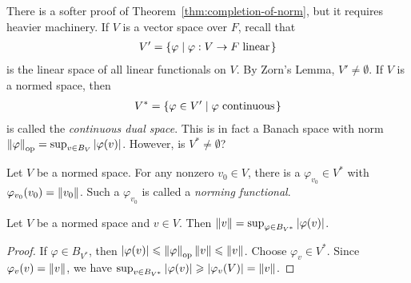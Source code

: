     There is a softer proof of Theorem~\ref{thm:completion-of-norm}, but it requires heavier machinery. If $V$ is a vector space over $F$, recall that
        \begin{equation*}
        \begin{split}
            V' = \{\varphi \mid \varphi:V \rightarrow F \h3\text{linear}\h1\}
        \end{split}
        \end{equation*}
    is the linear space of all linear functionals on $V$. By Zorn's Lemma, $V' \neq \emptyset$. If $V$ is a normed space, then 
        \begin{equation*}
        \begin{split}
            V^\ast = \{\varphi \in V' \mid \varphi \h3\text{continuous}\h1\}
        \end{split}
        \end{equation*}
    is called the \textit{continuous dual space}. This is in fact a Banach space with norm $\lnorm \varphi \rnorm_{\op} = \sup_{v \in B_V}|\varphi(v)|$. However, is $V^\ast \neq \emptyset$?

    \begin{theorem}
        Let $V$ be a normed space. For any nonzero $v_0 \in V$, there is a $\varphi_{v_0} \in V^\ast$ with $\varphi_{v_0}(v_0) = \lnorm v_0 \rnorm$. Such a $\varphi_{v_0}$ is called a \textit{norming functional}.
    \end{theorem}

    \begin{corollary}
        Let $V$ be a normed space and $v \in V$. Then $\lnorm v \rnorm = \sup_{\varphi \in B_{V^\ast}}|\varphi(v)|$.
    \end{corollary}
        \begin{proof}
            If $\varphi \in B_{V^\ast}$, then $|\varphi(v)| \leq \lnorm \varphi \rnorm_{\op} \lnorm v \rnorm \leq \lnorm v \rnorm$. Choose $\varphi_v \in V^\ast$. Since $\varphi_v(v) = \lnorm v \rnorm$, we have $\sup_{v \in B_{V^\ast}}|\varphi(v)| \geq |\varphi_v(V)| = \lnorm v \rnorm$.
        \end{proof}

